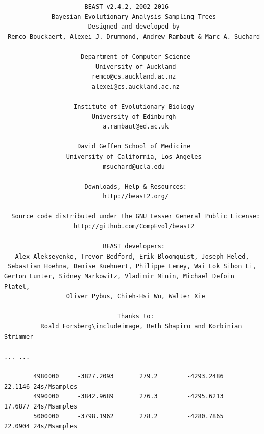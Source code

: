 \documentclass{article}
\newcommand{\includeimage}[2][]{%
\texttt{[image: \#2]}
}
\begin{document}
{\tiny   
\begin{verbatim}
                      BEAST v2.4.2, 2002-2016
             Bayesian Evolutionary Analysis Sampling Trees
                       Designed and developed by
 Remco Bouckaert, Alexei J. Drummond, Andrew Rambaut & Marc A. Suchard
                                    
                     Department of Computer Science
                         University of Auckland
                        remco@cs.auckland.ac.nz
                        alexei@cs.auckland.ac.nz
                                    
                   Institute of Evolutionary Biology
                        University of Edinburgh
                           a.rambaut@ed.ac.uk
                                    
                    David Geffen School of Medicine
                 University of California, Los Angeles
                           msuchard@ucla.edu
                                    
                      Downloads, Help & Resources:
                           http://beast2.org/
                                    
  Source code distributed under the GNU Lesser General Public License:
                   http://github.com/CompEvol/beast2
                                    
                           BEAST developers:
   Alex Alekseyenko, Trevor Bedford, Erik Bloomquist, Joseph Heled, 
 Sebastian Hoehna, Denise Kuehnert, Philippe Lemey, Wai Lok Sibon Li, 
Gerton Lunter, Sidney Markowitz, Vladimir Minin, Michael Defoin Platel, 
                 Oliver Pybus, Chieh-Hsi Wu, Walter Xie
                                    
                               Thanks to:
          Roald Forsberg\includeimage, Beth Shapiro and Korbinian Strimmer

... ...

        4980000     -3827.2093       279.2        -4293.2486        22.1146 24s/Msamples
        4990000     -3842.9689       276.3        -4295.6213        17.6877 24s/Msamples
        5000000     -3798.1962       278.2        -4280.7865        22.0904 24s/Msamples


\end{verbatim}}
\end{document}
